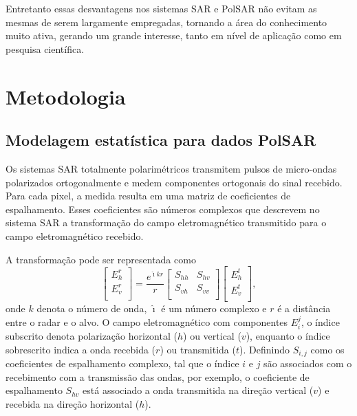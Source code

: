 Entretanto essas desvantagens nos sistemas SAR e PolSAR não evitam as mesmas de serem largamente empregadas, tornando a área do conhecimento muito ativa, gerando um grande interesse, tanto em nível de aplicação como em pesquisa científica.

\chapter{Metodologia}

\section{Modelagem estatística para dados PolSAR}\label{cap_acf_sec1}
Os sistemas SAR totalmente polarimétricos transmitem pulsos de micro-ondas polarizados ortogonalmente e medem componentes ortogonais do sinal recebido. Para cada pixel, a medida resulta em uma matriz de coeficientes de espalhamento. Esses coeficientes são números complexos que descrevem no sistema SAR a transformação do campo eletromagnético transmitido para o campo eletromagnético recebido.

A transformação pode ser representada como
\begin{equation}\label{cap_acf_1}
 \left[
\begin{array}{c}
	E_{h}^{r}   \\
	E_{v}^{r}    \\
\end{array}
\right]
 = \frac{e^{\hat{\imath} kr}}{r}\left[
\begin{array}{cc}
	S_{hh}   & S_{hv}   \\
	S_{vh}   & S_{vv}   \\
\end{array}
\right]
 \left[
\begin{array}{c}
	E_{h}^{t}   \\
	E_{v}^{t}    \\
\end{array}
\right],
\end{equation}
onde $k$ denota o número de onda, $\hat{\imath}$ é um número complexo e $r$ é a distância entre o radar e o alvo. O campo eletromagnético com componentes $E_{i}^{j}$, o índice subscrito denota polarização horizontal ($h$) ou vertical ($v$),  enquanto o índice sobrescrito indica a onda recebida ($r$) ou transmitida ($t$). Definindo $S_{i,j}$ como os coeficientes de espalhamento complexo, tal que o índice $i$ e $j$ são associados com o recebimento com a transmissão das ondas, por exemplo, o coeficiente de espalhamento $S_{hv}$ está associado a onda transmitida na direção vertical ($v$) e recebida na direção horizontal ($h$).


